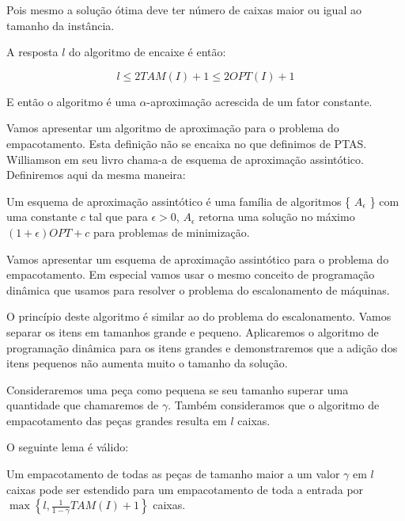 Pois mesmo a solução ótima deve ter número de caixas maior ou igual ao tamanho da instância.

A resposta $l$ do algoritmo de encaixe é então:

\begin{equation}
l \leq 2 TAM(I) + 1 \leq 2 OPT(I) + 1
\end{equation}

E então o algoritmo é uma $\alpha$-aproximação acrescida de um fator constante.

Vamos apresentar um algoritmo de aproximação para o problema do empacotamento. Esta definição não se encaixa no que definimos de PTAS. Williamson em seu livro \cite{Williamson} chama-a de esquema de aproximação assintótico. Definiremos aqui da mesma maneira:

\begin{definition}
Um esquema de aproximação assintótico é uma família de algoritmos \{ $A_\epsilon$ \} com uma constante $c$ tal que para $\epsilon > 0$, $A_\epsilon$ retorna uma solução no máximo $(1 + \epsilon) OPT + c$ para problemas de minimização. 
\end{definition}

Vamos apresentar um esquema de aproximação assintótico para o problema do empacotamento. Em especial vamos usar o mesmo conceito de programação dinâmica que usamos para resolver o problema do escalonamento de máquinas.

O princípio deste algoritmo é similar ao do problema do escalonamento. Vamos separar os itens em tamanhos grande e pequeno. Aplicaremos o algoritmo de programação dinâmica para os itens grandes e demonstraremos que a adição dos itens pequenos não aumenta muito o tamanho da solução.

Consideraremos uma peça como pequena se seu tamanho superar uma quantidade que chamaremos de $\gamma$. Também consideramos que o algoritmo de empacotamento das peças grandes resulta em $l$ caixas.

O seguinte lema é válido:

\begin{lema}
\label{lem:empacotamento}
Um empacotamento de todas as peças de tamanho maior a um valor $\gamma$ em $l$ caixas pode ser estendido para um empacotamento de toda a entrada por $\max \left\{ l,\frac{1}{1-\gamma} TAM(I) + 1\right\}$ caixas.
\end{lema}

